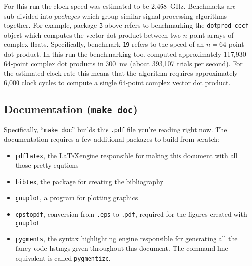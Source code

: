 %
For this run the clock speed was estimated to be 2.468~GHz.
Benchmarks are sub-divided into {\em packages} which group similar
signal processing algorithms together.
For example, package {\tt 3} above refers to benchmarking the
{\tt dotprod\_cccf} object which computes the vector dot product
between two $n$-point arrays of complex floats.
Specifically, benchmark {\tt 19} refers to the speed of an $n=64$-point
dot product.
In this run the benchmarking tool computed approximately 117,930
64-point complex dot products in 300~ms
(about 393,107 trials per second).
For the estimated clock rate this means that the algorithm requires
approximately 6,000 clock cycles to compute
a single 64-point complex vector dot product.

\subsection{Documentation ({\tt make doc})}
\label{section:installation:targets:doc}
Specifically, ``{\tt make doc}'' builds this {\tt .pdf} file you're
reading right now.
The documentation requires a few additional packages to build from
scratch:
%
\begin{itemize}
\item {\tt pdflatex}, the \LaTeX engine responsible for making this
      document with all those pretty equtions
\item {\tt bibtex}, the package for creating the bibliography
\item {\tt gnuplot}, a program for plotting graphics
\item {\tt epstopdf}, conversion from {\tt .eps} to {\tt .pdf}, required
      for the figures created with {\tt gnuplot}
\item {\tt pygments}, the syntax highlighting engine responsible for
      generating all the fancy code listings given throughout this
      document.
      The command-line equivalent is called {\tt pygmentize}.
\end{itemize}
%

